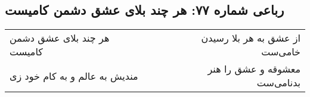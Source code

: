 \begin{center}
\section*{رباعی شماره ۷۷: هر چند بلای عشق دشمن کامیست}
\label{sec:sh077}
\begin{longtable}{l p{0.5cm} r}
هر چند بلای عشق دشمن کامیست
&&
از عشق به هر بلا رسیدن خامی‌ست
\\
مندیش به عالم و به کام خود زی
&&
معشوقه و عشق را هنر بدنامی‌ست
\\
\end{longtable}
\end{center}
